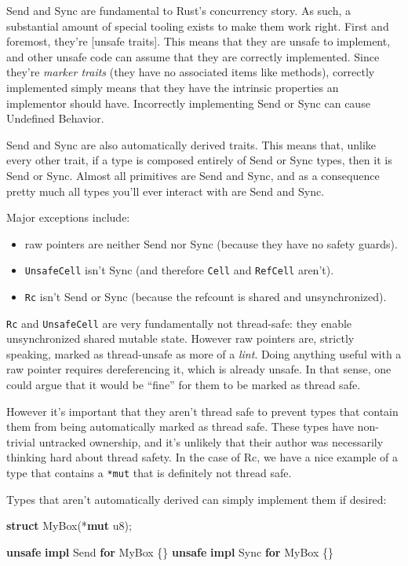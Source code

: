 \documentclass[a4paper,]{book}
\newenvironment{Shaded}{\begin{snugshade}}{\end{snugshade}}
\newcommand{\KeywordTok}[1]{\textcolor[rgb]{0.13,0.29,0.53}{\textbf{{#1}}}}
\newcommand{\DataTypeTok}[1]{\textcolor[rgb]{0.13,0.29,0.53}{{#1}}}
\newcommand{\BuiltInTok}[1]{{#1}}
\newcommand{\NormalTok}[1]{{#1}}
\providecommand{\tightlist}{%
  \setlength{\itemsep}{0pt}\setlength{\parskip}{0pt}}
\begin{document}
Send and Sync are fundamental to Rust's concurrency story. As such, a
substantial amount of special tooling exists to make them work right.
First and foremost, they're {[}unsafe traits{]}. This means that they
are unsafe to implement, and other unsafe code can assume that they are
correctly implemented. Since they're \emph{marker traits} (they have no
associated items like methods), correctly implemented simply means that
they have the intrinsic properties an implementor should have.
Incorrectly implementing Send or Sync can cause Undefined Behavior.

Send and Sync are also automatically derived traits. This means that,
unlike every other trait, if a type is composed entirely of Send or Sync
types, then it is Send or Sync. Almost all primitives are Send and Sync,
and as a consequence pretty much all types you'll ever interact with are
Send and Sync.

Major exceptions include:

\begin{itemize}
\tightlist
\item
  raw pointers are neither Send nor Sync (because they have no safety
  guards).
\item
  \texttt{UnsafeCell} isn't Sync (and therefore \texttt{Cell} and
  \texttt{RefCell} aren't).
\item
  \texttt{Rc} isn't Send or Sync (because the refcount is shared and
  unsynchronized).
\end{itemize}

\texttt{Rc} and \texttt{UnsafeCell} are very fundamentally not
thread-safe: they enable unsynchronized shared mutable state. However
raw pointers are, strictly speaking, marked as thread-unsafe as more of
a \emph{lint}. Doing anything useful with a raw pointer requires
dereferencing it, which is already unsafe. In that sense, one could
argue that it would be ``fine'' for them to be marked as thread safe.

However it's important that they aren't thread safe to prevent types
that contain them from being automatically marked as thread safe. These
types have non-trivial untracked ownership, and it's unlikely that their
author was necessarily thinking hard about thread safety. In the case of
Rc, we have a nice example of a type that contains a \texttt{*mut} that
is definitely not thread safe.

Types that aren't automatically derived can simply implement them if
desired:

\begin{Shaded}
\begin{Highlighting}[]
\KeywordTok{struct} \NormalTok{MyBox(*}\KeywordTok{mut} \DataTypeTok{u8}\NormalTok{);}

\KeywordTok{unsafe} \KeywordTok{impl} \BuiltInTok{Send} \KeywordTok{for} \NormalTok{MyBox \{\}}
\KeywordTok{unsafe} \KeywordTok{impl} \BuiltInTok{Sync} \KeywordTok{for} \NormalTok{MyBox \{\}}
\end{Highlighting}
\end{Shaded}
\end{document}
